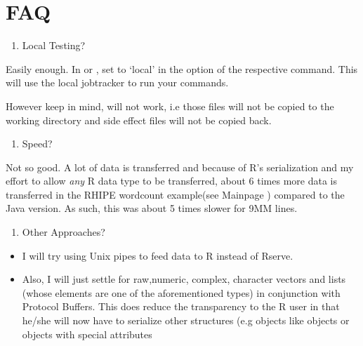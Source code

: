 \documentclass[letterpaper,10pt,english]{manual}
\begin{document}
\chapter{FAQ}
\begin{enumerate}
\item {} 
Local Testing?

\end{enumerate}

Easily enough. In  or , set  to
`local' in the  option of the respective command. This will
use the local jobtracker to run your commands.

However keep in mind,
 will not work, i.e those files will not be copied to the
working directory and side effect files will not be copied back.
\begin{enumerate}
\item {} 
Speed?

\end{enumerate}

Not so good. A lot of data is transferred and because of R's serialization and
my effort to allow \emph{any} R data type to be transferred, about 6 times more data
is transferred in the RHIPE wordcount example(see Mainpage )
compared to the Java version. As such, this was about 5 times slower for 9MM
lines.
\begin{enumerate}
\item {} 
Other Approaches?

\end{enumerate}
\begin{itemize}
\item {} 
I will try using Unix pipes to feed data to R instead of Rserve.

\item {} 
Also, I will just settle for raw,numeric, complex, character vectors and lists
(whose elements are one of the aforementioned types) in conjunction with
Protocol Buffers. This does reduce the transparency to the R user in that
he/she will now have to serialize other structures (e.g objects like 
objects or objects with special attributes

\end{itemize}


\renewcommand{\indexname}{Module Index}
\printmodindex
\renewcommand{\indexname}{Index}
\printindex
\end{document}
